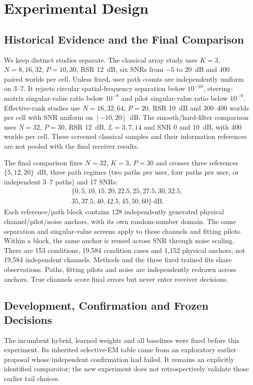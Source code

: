\section{Experimental Design}
\label{sec:protocol}
\subsection{Historical Evidence and the Final Comparison}
We keep distinct studies separate. The classical array study uses $K=3$, $N=8,16,32$, $P=10,30$, RSR 12~dB, six SNRs from $-5$ to 20~dB and 400 paired worlds per cell. Unless fixed, user path counts are independently uniform on 3--7. It rejects circular spatial-frequency separation below $10^{-10}$, steering-matrix singular-value ratio below $10^{-8}$ and pilot singular-value ratio below $10^{-8}$. Effective-rank studies use $N=16,32,64$, $P=20$, RSR 10~dB and 300--400 worlds per cell with SNR uniform on $[-10,20]$~dB. The smooth/hard-filter comparison uses $N=32$, $P=30$, RSR 12~dB, $L=3,7,14$ and SNR 0 and 10~dB, with 400 worlds per cell. These screened classical samples and their information references are not pooled with the final receiver results.

The final comparison fixes $N=32$, $K=3$, $P=30$ and crosses three references $\{5,12,20\}$~dB, three path regimes (two paths per user, four paths per user, or independent 3--7 paths) and 17 SNRs:
\begin{equation*}
 \begin{gathered}
 \{0,5,10,15,20,22.5,25,27.5,30,32.5,\\
 35,37.5,40,42.5,45,50,60\}\ \mathrm{dB}.
 \end{gathered}
\end{equation*}
Each reference/path block contains 128 independently generated physical channel/pilot/noise anchors, with its own random-number domain. The same separation and singular-value screens apply to these channels and fitting pilots. Within a block, the same anchor is reused across SNR through noise scaling. There are 153 conditions, 19,584 condition cases and 1,152 physical anchors, not 19,584 independent channels. Methods and the three fixed trained fits share observations. Paths, fitting pilots and noise are independently redrawn across anchors. True channels score final errors but never enter receiver decisions.

\subsection{Development, Confirmation and Frozen Decisions}
The incumbent hybrid, learned weights and all baselines were fixed before this experiment. Its inherited selective-EM table came from an exploratory earlier proposal whose independent confirmation had failed. It remains an explicitly identified comparator; the new experiment does not retrospectively validate those earlier tail choices.

